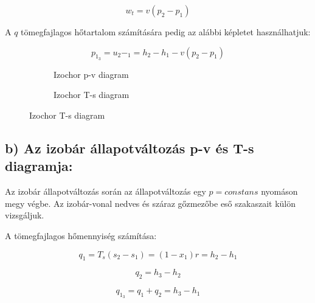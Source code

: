 \begin{equation*}
	w_t = v (p_2 - p_1)
\end{equation*}

A $q$ tömegfajlagos hőtartalom számítására pedig az alábbi képletet használhatjuk:

\begin{equation*}
p_1_3 = u_2-_1 = h_2-h_1-v(p_2-p_1)
\end{equation*}


\begin{figure}[h]
	\centering
	\begin{subfigure}[b]{0.545\textwidth} 
		\centering
		\begin{tikzpicture}
		
		
		
		\end{tikzpicture}
		\caption{Izochor p-v diagram}
		
	\end{subfigure}
	\begin{subfigure}[b]{0.435\textwidth}
		\centering
		\begin{tikzpicture}
		
		
		
		\end{tikzpicture}
		\caption{Izochor T-s diagram}
		
	\end{subfigure}
\end{figure}

\pagebreak

\subsection*{b) Az izobár állapotváltozás p-v és T-s diagramja:}

Az izobár állapotváltozás során az állapotváltozás egy $p=constans$ nyomáson megy végbe. Az izobár-vonal nedves és száraz gőzmezőbe eső szakaszait külön vizsgáljuk.

A tömegfajlagos hőmennyiség számítása:

\begin{equation*}
q_1 = T_s (s_2-s_1) = (1-x_1)r = h_2-h_1
\end{equation*}

\begin{equation*}
q_2 = h_3-h_2
\end{equation*}

\begin{equation*}
q_1_3 = q_1+q_2 = h_3-h_1
\end{equation*}

